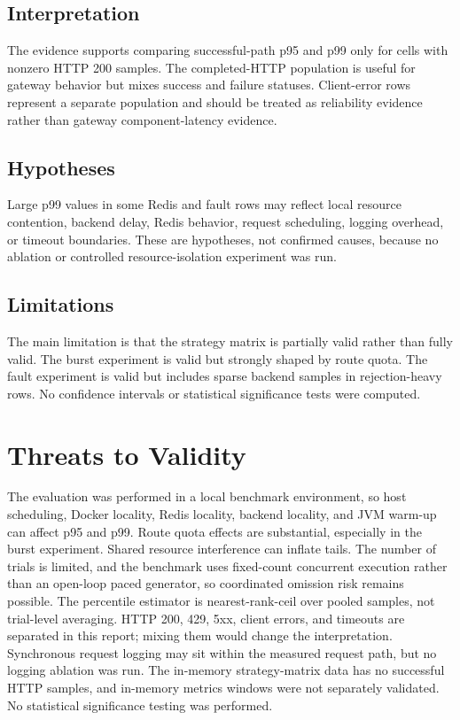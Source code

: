 \documentclass[conference]{IEEEtran}
\begin{document}
\subsection{Interpretation}
The evidence supports comparing successful-path p95 and p99 only for cells with nonzero HTTP 200 samples. The completed-HTTP population is useful for gateway behavior but mixes success and failure statuses. Client-error rows represent a separate population and should be treated as reliability evidence rather than gateway component-latency evidence.

\subsection{Hypotheses}
Large p99 values in some Redis and fault rows may reflect local resource contention, backend delay, Redis behavior, request scheduling, logging overhead, or timeout boundaries. These are hypotheses, not confirmed causes, because no ablation or controlled resource-isolation experiment was run.

\subsection{Limitations}
The main limitation is that the strategy matrix is partially valid rather than fully valid. The burst experiment is valid but strongly shaped by route quota. The fault experiment is valid but includes sparse backend samples in rejection-heavy rows. No confidence intervals or statistical significance tests were computed.

\section{Threats to Validity}
The evaluation was performed in a local benchmark environment, so host scheduling, Docker locality, Redis locality, backend locality, and JVM warm-up can affect p95 and p99. Route quota effects are substantial, especially in the burst experiment. Shared resource interference can inflate tails. The number of trials is limited, and the benchmark uses fixed-count concurrent execution rather than an open-loop paced generator, so coordinated omission risk remains possible. The percentile estimator is nearest-rank-ceil over pooled samples, not trial-level averaging. HTTP 200, 429, 5xx, client errors, and timeouts are separated in this report; mixing them would change the interpretation. Synchronous request logging may sit within the measured request path, but no logging ablation was run. The in-memory strategy-matrix data has no successful HTTP samples, and in-memory metrics windows were not separately validated. No statistical significance testing was performed.
\end{document}
